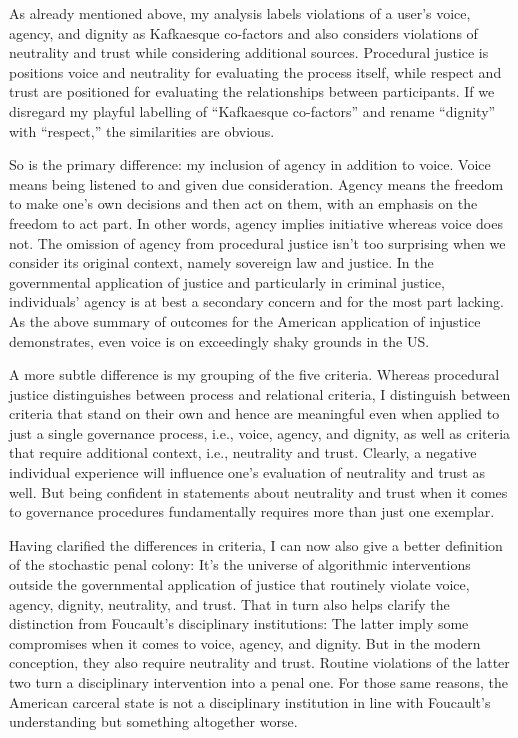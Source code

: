 As already mentioned above, my analysis labels violations of a user's voice,
agency, and dignity as Kafkaesque co-factors and also considers violations of
neutrality and trust while considering additional sources. Procedural justice is
positions voice and neutrality for evaluating the process itself, while respect
and trust are positioned for evaluating the relationships between participants.
If we disregard my playful labelling of ``Kafkaesque co-factors'' and rename
``dignity'' with ``respect,'' the similarities are obvious.

So is the primary difference: my inclusion of agency in addition to voice. Voice
means being listened to and given due consideration. Agency means the freedom to
make one's own decisions and then act on them, with an emphasis on the freedom
to act part. In other words, agency implies initiative whereas voice does not.
The omission of agency from procedural justice isn't too surprising when we
consider its original context, namely sovereign law and justice. In the
governmental application of justice and particularly in criminal justice,
individuals' agency is at best a secondary concern and for the most part
lacking. As the above summary of outcomes for the American application of
injustice demonstrates, even voice is on exceedingly shaky grounds in the US.

A more subtle difference is my grouping of the five criteria. Whereas procedural
justice distinguishes between process and relational criteria, I distinguish
between criteria that stand on their own and hence are meaningful even when
applied to just a single governance process, i.e., voice, agency, and dignity,
as well as criteria that require additional context, i.e., neutrality and trust.
Clearly, a negative individual experience will influence one's evaluation of
neutrality and trust as well. But being confident in statements about neutrality
and trust when it comes to governance procedures fundamentally requires more
than just one exemplar.

Having clarified the differences in criteria, I can now also give a better
definition of the stochastic penal colony: It's the universe of algorithmic
interventions outside the governmental application of justice that routinely
violate voice, agency, dignity, neutrality, and trust. That in turn also helps
clarify the distinction from Foucault's disciplinary institutions: The latter
imply some compromises when it comes to voice, agency, and dignity. But in the
modern conception, they also require neutrality and trust. Routine violations of
the latter two turn a disciplinary intervention into a penal one. For those same
reasons, the American carceral state is not a disciplinary institution in line
with Foucault's understanding but something altogether worse.
